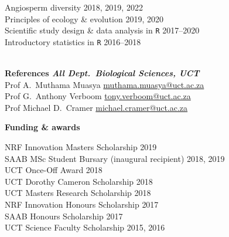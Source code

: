 \documentclass[10pt]{article}
\begin{document}
\begin{multicols}{2}
Angiosperm diversity                         \hfill {\small 2018, 2019, 2022} \\
Principles of ecology \& evolution           \hfill {\small       2019, 2020} \\
Scientific study design \& data analysis in
  \texttt{R}                                 \hfill {\small       2017--2020} \\
Introductory statistics in \texttt{R}        \hfill {\small       2016--2018} \\

\

\textbf{References %
        \hfill {\small \textmd{\textit{All Dept.~Biological Sciences, UCT}}}} \\

Prof A.~Muthama Muasya
      \hfill \href{mailto:muthama.muasya@uct.ac.za}{muthama.muasya@uct.ac.za} \\
Prof G.~Anthony Verboom
      \hfill     \href{mailto:tony.verboom@uct.ac.za}{tony.verboom@uct.ac.za} \\
Prof Michael D.~Cramer
      \hfill \href{mailto:michael.cramer@uct.ac.za}{michael.cramer@uct.ac.za} \\

\columnbreak

\textbf{\large Funding \& awards} %

NRF Innovation Masters Scholarship                 \hfill {\small       2019} \\
SAAB MSc Student Bursary
  {\small (inaugural recipient)}                   \hfill {\small 2018, 2019} \\
UCT Once-Off Award                                 \hfill {\small       2018} \\
UCT Dorothy Cameron Scholarship                    \hfill {\small       2018} \\
UCT Masters Research Scholarship                   \hfill {\small       2018} \\
NRF Innovation Honours Scholarship                 \hfill {\small       2017} \\
SAAB Honours Scholarship                           \hfill {\small       2017} \\
UCT Science Faculty Scholarship                    \hfill {\small 2015, 2016} \\


\end{multicols}
\end{document}
